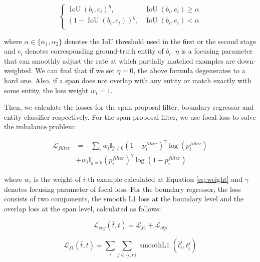 \documentclass[11pt,a4paper]{article}
\begin{document}
\begin{equation}
\left\{
            \begin{array}{lr}
             \operatorname{IoU}(b_i,e_i)^\eta, &  \operatorname{IoU}(b_i,e_i)\geq \alpha \\
             
             \left(1-\operatorname{IoU}(b_i,e_i)\right)^\eta, & \operatorname{IoU}(b_i,e_i)<\alpha\\
             \end{array}
\right.
\label{eq:weight}
\end{equation}

\noindent where $\alpha \in \{\alpha_1, \alpha_2\}$ denotes the IoU threshold used in the first or the second stage and $e_i$ denotes corresponding ground-truth entity of $b_i$. $\eta$ is a focusing parameter that can smoothly adjust the rate at which partially matched examples are down-weighted. We can find that if we set $\eta=0$, the above formula degenerates to a hard one. Also, if a span does not overlap with any entity or match exactly with some entity, the loss weight $w_i=1$.





Then, we calculate the losses for the span proposal filter, boundary regressor and entity classifier respectively. For the span proposal filter, we use focal loss \citep{8237586} to solve the imbalance problem:


\begin{equation}
\begin{aligned}
    \mathcal{L}_{filter} &= -\sum_i w_i \mathbb{I}_{\hat{y}\neq0}(1-p_i^{filter})^\gamma\log(p_i^{filter})\\ &+w_i\mathbb{I}_{\hat{y}= 0}(p_i^{filter})^\gamma  \log(1-p_i^{filter})
    \end{aligned}
\end{equation}

\noindent where $w_i$ is the weight of $i$-th example calculated at Equation \ref{eq:weight} and $\gamma$ denotes focusing parameter of focal loss.  For the boundary regressor, the loss consists of two components, the smooth L1 loss at the boundary level and the overlap loss at the span level, calculated as follows:

\begin{equation}
\mathcal{L}_{reg}\left(\hat{t}, t\right)=\mathcal{L}_{f1}+\mathcal{L}_{olp}
\end{equation}

\begin{equation}
\mathcal{L}_{f1}\left(\hat{t}, t\right)=\sum_i \sum_{j \in\{l, r\}} \operatorname{ smoothL1}\left(\hat{t}^j_{i}, t^j_{i}\right)
\end{equation}
\end{document}

